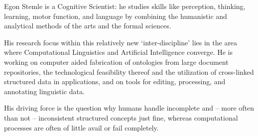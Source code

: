 Egon Stemle is a Cognitive Scientist: he studies skills like perception, thinking, learning, motor function, and language by combining the humanistic and analytical methods of the arts and the formal sciences.

His research focus within this relatively new `inter-discipline' lies in the area where Computational Linguistics and Artificial Intelligence converge. He is working on computer aided fabrication of ontologies from large document repositories, the technological feasibility thereof and the utilization of cross-linked structured data in applications, and on tools for editing, processing, and annotating linguistic data.

His driving force is the question why humans handle incomplete and -- more often than not -- inconsistent structured concepts just fine, whereas computational processes are often of little avail or fail completely. 
